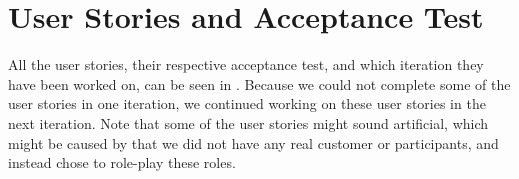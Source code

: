 
\chapter{User Stories and Acceptance Test}
\label{app:user_stories_and_acceptance_test}

All the user stories, their respective acceptance test, and which iteration they have been worked on, can be seen in . Because we could not complete some of the user stories in one iteration, we continued working on these user stories in the next iteration. Note that some of the user stories might sound artificial, which might be caused by that we did not have any real customer or participants, and instead chose to role-play these roles.

